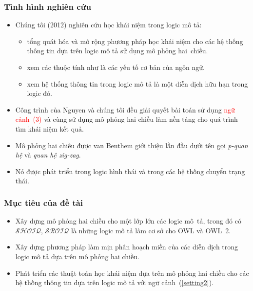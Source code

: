 \documentclass[fleqn]{beamer}
\def\eqref#1{(\ref{#1})}
\newcommand{\SHOIQ}		{$\mathcal{SHOIQ}$\xspace}
\newcommand{\SROIQ}		{$\mathcal{SROIQ}$\xspace}
\begin{document}
\begin{frame}\frametitle{\bf Tình hình nghiên cứu}
\begin{itemize}
  \item Chúng tôi (2012) nghiên cứu học khái niệm trong logic mô tả:
  
  \begin{itemize}
    \item tổng quát hóa và mở rộng phương pháp học khái niệm cho các hệ thống thông tin dựa trên logic mô tả sử dụng mô phỏng hai~chiều.
    \vspace{1.0ex}
  
	\item xem các thuộc tính như là các yếu tố cơ bản của ngôn ngữ.
    \vspace{1.0ex}
	
	\item xem hệ thống thông tin trong logic mô tả là một diễn dịch hữu hạn trong logic đó.
  \end{itemize} 
  \vspace{1.0ex}
  \item Công trình của Nguyen và chúng tôi đều giải quyết bài toán sử dụng \textcolor{red}{ngữ cảnh~(3)} và cùng sử dụng mô phỏng hai chiều làm nền tảng cho quá trình tìm khái niệm kết quả.
  \vspace{1.0ex}
  
  \item Mô phỏng hai chiều được van Benthem giới thiệu lần đầu dưới tên gọi {\em p-quan hệ} và {\em quan hệ zig-zag}.
  \vspace{1.0ex}
  
  \item Nó được phát triển trong logic hình thái và trong các hệ thống chuyển trạng thái.  
  \end{itemize}
\end{frame}
\begin{frame}\frametitle{\bf Mục tiêu của đề tài}
\begin{itemize}
  \item Xây dựng mô phỏng hai chiều cho một lớp lớn các logic mô~tả, trong đó có \SHOIQ, \SROIQ là những logic mô tả làm cơ sở cho OWL và OWL~2.
  \vspace{1.0ex}
  
  \item Xây dựng phương pháp làm mịn phân hoạch miền của các diễn dịch trong logic mô tả dựa trên mô phỏng hai chiều.
  \vspace{1.0ex}
  
  \item Phát triển các thuật toán học khái niệm dựa trên mô phỏng hai chiều cho các hệ thống thông tin dựa trên logic mô tả với ngữ cảnh~\eqref{setting2}.
  \vspace{1.0ex}
\end{itemize}
\end{frame}
\end{document}
